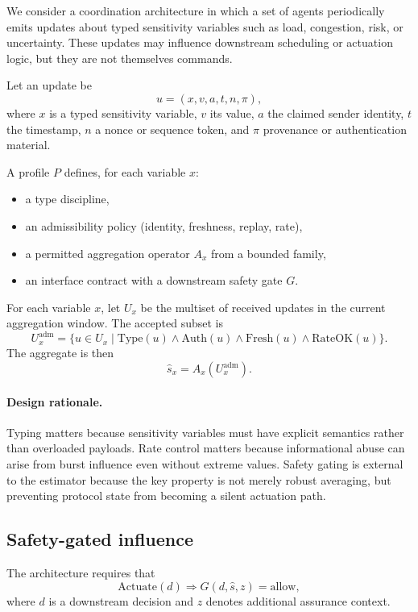 \documentclass[11pt]{article}
\begin{document}
We consider a coordination architecture in which a set of agents periodically emits updates about typed sensitivity variables such as load, congestion, risk, or uncertainty. These updates may influence downstream scheduling or actuation logic, but they are not themselves commands.

Let an update be
\[
u = (x, v, a, t, n, \pi),
\]
where $x$ is a typed sensitivity variable, $v$ its value, $a$ the claimed sender identity, $t$ the timestamp, $n$ a nonce or sequence token, and $\pi$ provenance or authentication material.

A profile $P$ defines, for each variable $x$:
\begin{itemize}[leftmargin=1.5em]
    \item a type discipline,
    \item an admissibility policy (identity, freshness, replay, rate),
    \item a permitted aggregation operator $A_x$ from a bounded family,
    \item an interface contract with a downstream safety gate $G$.
\end{itemize}

For each variable $x$, let $U_x$ be the multiset of received updates in the current aggregation window. The accepted subset is
\[
U_x^{\mathrm{adm}} = \{u \in U_x \mid \mathrm{Type}(u) \wedge \mathrm{Auth}(u) \wedge \mathrm{Fresh}(u) \wedge \mathrm{RateOK}(u)\}.
\]
The aggregate is then
\[
\hat{s}_x = A_x(U_x^{\mathrm{adm}}).
\]

\paragraph{Design rationale.}
Typing matters because sensitivity variables must have explicit semantics rather than overloaded payloads. Rate control matters because informational abuse can arise from burst influence even without extreme values. Safety gating is external to the estimator because the key property is not merely robust averaging, but preventing protocol state from becoming a silent actuation path.

\subsection{Safety-gated influence}

The architecture requires that
\[
\mathrm{Actuate}(d) \Rightarrow G(d,\hat{s},z) = \mathrm{allow},
\]
where $d$ is a downstream decision and $z$ denotes additional assurance context.
\end{document}

